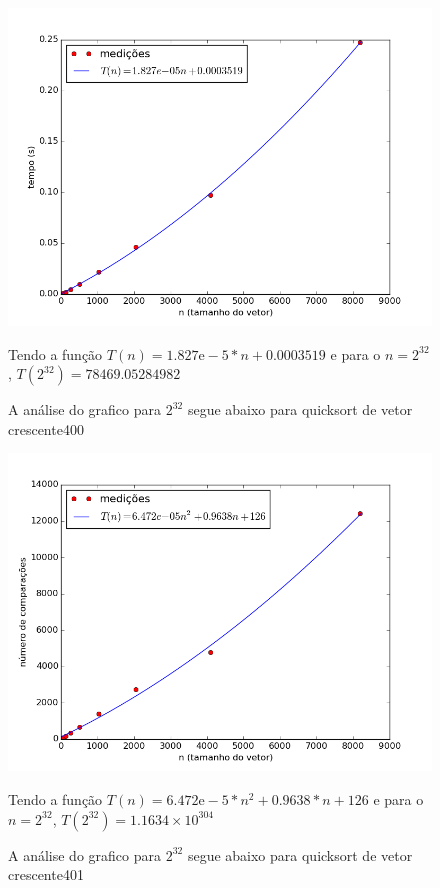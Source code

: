 \documentclass[12pt,a4paper,twoside]{report}
\begin{document}


\begin{figure}[ht]
\centering \includegraphics[scale=0.8]{../quicksort/imagens/quicksortQuaseCresc400.png}
\caption{A análise do grafico para $2^{32}$ segue abaixo para quicksort de vetor crescente400}

Tendo a função $T(n) = 1.827\mathrm{e}-5*n+0.0003519$ e para o $n =2^{32}$, $T(2^{32}) = 78469.05284982$ 

\label{fig:quicksortQuaseCresc400}
\end{figure}

\begin{figure}[ht]
\centering \includegraphics[scale=0.8]{../quicksort/imagens/quicksortQuaseCresc401.png}
\caption{A análise do grafico para $2^{32}$ segue abaixo para quicksort de vetor crescente401}
Tendo a função $T(n) = 6.472\mathrm{e}-5*n^2+0.9638*n+126$ e para o $n =2^{32}$, $T(2^{32}) = 1.1634 × 10^{304}$ 

\label{fig:quicksortQuaseCresc401}
\end{figure}
\end{document}

